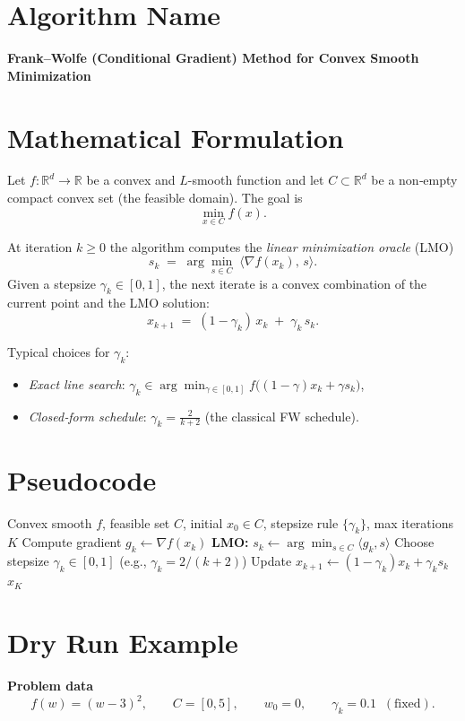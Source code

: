 \documentclass{article}
\newcommand{\R}{\mathbb{R}}
\begin{document}
\section*{Algorithm Name}
\textbf{Frank–Wolfe (Conditional Gradient) Method for Convex Smooth Minimization}

\section*{Mathematical Formulation}
Let $f:\R^{d}\rightarrow\R$ be a convex and $L$-smooth function and let $C\subset\R^{d}$ be a non‑empty compact convex set (the feasible domain).  
The goal is
\[
\min_{x\in C} f(x).
\]

At iteration $k\ge 0$ the algorithm computes the \emph{linear minimization oracle} (LMO)
\[
s_{k}\;=\;\arg\min_{s\in C}\;\langle \nabla f(x_{k}),\,s\rangle .
\tag{1}
\]
Given a stepsize $\gamma_{k}\in[0,1]$, the next iterate is a convex combination of the current point and the LMO solution:
\[
x_{k+1}\;=\;(1-\gamma_{k})\,x_{k}\;+\;\gamma_{k}\,s_{k}.
\tag{2}
\]

Typical choices for $\gamma_{k}$:
\begin{itemize}
\item \emph{Exact line search}: $\displaystyle\gamma_{k}\in\arg\min_{\gamma\in[0,1]} f\big((1-\gamma)x_{k}+\gamma s_{k}\big)$,
\item \emph{Closed‑form schedule}: $\displaystyle\gamma_{k}= \frac{2}{k+2}$ (the classical FW schedule).
\end{itemize}

\section*{Pseudocode}
\begin{algorithm}[H]
\caption{Frank–Wolfe}
\begin{algorithmic}[1]
\Require Convex smooth $f$, feasible set $C$, initial $x_{0}\in C$, stepsize rule $\{\gamma_{k}\}$, max iterations $K$
    \State Compute gradient $g_{k}\gets\nabla f(x_{k})$
    \State \textbf{LMO:} $s_{k}\gets\arg\min_{s\in C}\langle g_{k},s\rangle$
    \State Choose stepsize $\gamma_{k}\in[0,1]$ (e.g., $\gamma_{k}=2/(k+2)$)
    \State Update $x_{k+1}\gets (1-\gamma_{k})x_{k}+\gamma_{k}s_{k}$
\EndFor
\State \Return $x_{K}$
\end{algorithmic}
\end{algorithm}

\section*{Dry Run Example}
\textbf{Problem data}
\[
f(w)=(w-3)^{2},\qquad C=[0,5],\qquad w_{0}=0,\qquad\gamma_{k}=0.1\;\;(\text{fixed}).
\]
\end{document}
